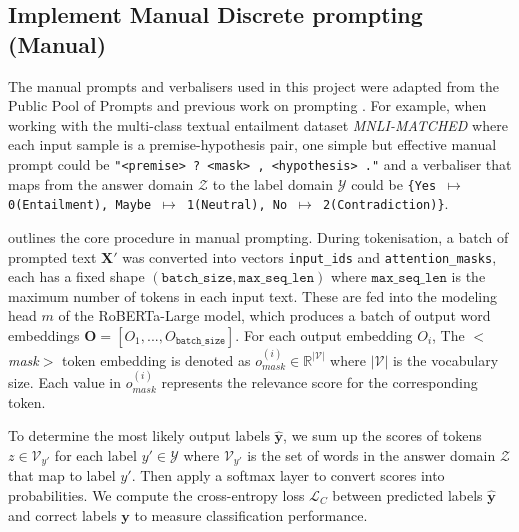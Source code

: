 \subsection{Implement Manual Discrete prompting (Manual)} \label{sec:manual-prompt}
The manual prompts and verbalisers used in this project were adapted from the Public Pool of Prompts \cite{Bach22OPP} and previous work on prompting \cite{Gao20PM, Lei22}. For example, when working with the multi-class textual entailment dataset \textit{MNLI-MATCHED} where each input sample is a premise-hypothesis pair, one simple but effective manual prompt could be \texttt{"<premise> ? <mask> , <hypothesis> ."} and a verbaliser that maps from the answer domain $\mathcal{Z}$ to the label domain $\mathcal{Y}$ could be \texttt{\{Yes $\mapsto$ 0(Entailment), Maybe $\mapsto$ 1(Neutral), No $\mapsto$ 2(Contradiction)\}}. 

 outlines the core procedure in manual prompting. During tokenisation, a batch of prompted text $\textbf{X}'$ was converted into vectors \texttt{input\_ids} and \texttt{attention\_masks}, each has a fixed shape $(\texttt{batch\_size}, \texttt{max\_seq\_len})$ where $\texttt{max\_seq\_len}$ is the maximum number of tokens in each input text. These are fed into the modeling head $m$ of the RoBERTa-Large model, which produces a batch of output word embeddings $\mathbf{O} = [O_1, ..., O_{\texttt{batch\_size}}]$. For each output embedding $O_i$, The $<$\textit{mask}$>$ token embedding is denoted as $o_{\textit{mask}}^{(i)} \in \mathbb{R}^{|\mathcal{V}|}$ where $|\mathcal{V}|$ is the vocabulary size. Each value in $o_{\textit{mask}}^{(i)}$ represents the relevance score for the corresponding token. 

To determine the most likely output labels $\hat{\textbf{y}}$, we sum up the scores of tokens $z \in \mathcal{V}_{y'}$ for each label $y' \in \mathcal{Y}$ where $\mathcal{V}_{y'}$ is the set of words in the answer domain $\mathcal{Z}$ that map to label $y'$. Then apply a softmax layer to convert scores into probabilities. We compute the cross-entropy loss $\mathcal{L}_C$ between predicted labels $\hat{\textbf{y}}$ and correct labels $\textbf{y}$ to measure classification performance. 

